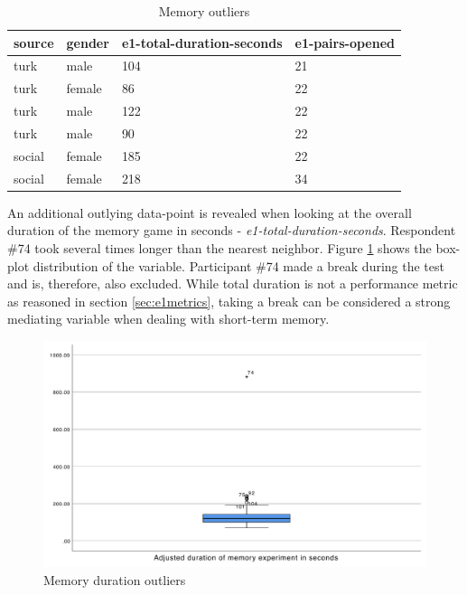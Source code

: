 		\begin{table}[]
			\begin{center}
				\begin{tabular}{|l|l|l|l|}
					\hline 
					source & gender & e1-total-duration-seconds & e1-pairs-opened \rule[-2ex]{0pt}{6ex} \\ \hline \hline
					turk   & male   & 104                          & \cellcolor[HTML]{FFFFC7}21                \\ \hline
					turk   & female & 86                           & \cellcolor[HTML]{FFFFC7}22                \\ \hline
					turk   & male   & 122                          & \cellcolor[HTML]{FFFFC7}22                \\ \hline
					turk   & male   & 90                           & \cellcolor[HTML]{FFFFC7}22                \\ \hline
					social & female & 185                          & \cellcolor[HTML]{FFFFC7}22                \\ \hline
					social & female & 218                          & 34                \\ \hline
				\end{tabular}
			\end{center}
			\caption{Memory outliers}
			\label{tbl:e1-pairs-opened}
		\end{table}
	
		An additional outlying data-point is revealed when looking at the overall duration of the memory game in seconds - \textit{e1-total-duration-seconds}. Respondent \#74 took several times longer than the nearest neighbor. Figure \ref{fig:memoryoutlier2} shows the box-plot distribution of the variable. Participant \#74 made a break during the test and is, therefore, also excluded. While total duration is not a performance metric as reasoned in section \ref{sec:e1metrics}, taking a break can be considered a strong mediating variable when dealing with short-term memory.
		
		
		\begin{figure}
			\centering
			\includegraphics[width=0.7\linewidth]{graphics/memoryOutlier2}
			\caption{Memory duration outliers }
			\label{fig:memoryoutlier2}
		\end{figure}
	
